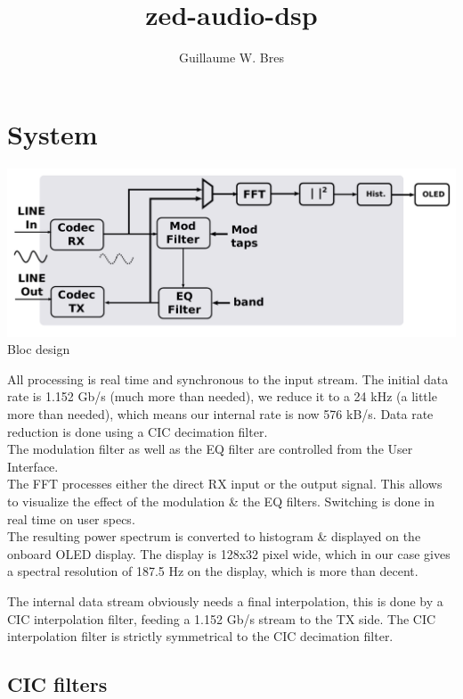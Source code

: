 \documentclass{article}
\author{Guillaume W. Bres}
\title{zed-audio-dsp}
\begin{document}
\maketitle
\tableofcontents

\newpage
\section{System}

\begin{center}
	\includegraphics[width=0.75\linewidth]{bloc_design.pdf} \\
	Bloc design
\end{center}

All processing is real time and synchronous to the input
stream. The initial data rate is 1.152 Gb/s (much more than needed),
we reduce it to a 24 kHz (a little more than needed),
which means our internal rate is now 576 kB/s.
Data rate reduction is done using a CIC decimation filter. \\

The modulation filter as well as the
EQ filter are controlled from the User Interface. \\

The FFT processes either the
direct RX input or the output signal.
This allows to visualize the effect
of the modulation \& the EQ filters.
Switching is done in real time on user specs. \\

The resulting power spectrum is converted to histogram
\& displayed on the onboard OLED display.
The display is 128x32 pixel wide, which in our case
gives a spectral resolution of 187.5 Hz
on the display, which is more than decent.

The internal data stream obviously needs a final
interpolation, this is done by a CIC interpolation
filter, feeding a 1.152 Gb/s stream to the TX side.
The CIC interpolation filter is strictly symmetrical
to the CIC decimation filter.

\subsection{CIC filters}
\end{document}
